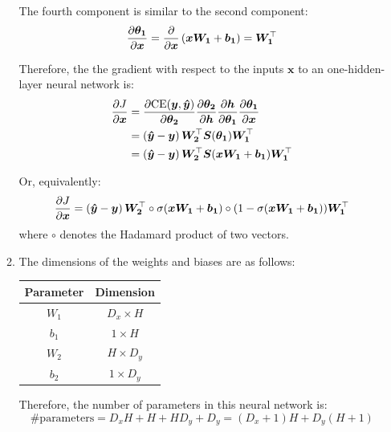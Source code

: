 \documentclass[10pt,reqno]{amsart}
\begin{document}
\begin{enumerate}[topsep=0pt,itemsep=3ex,partopsep=1ex,parsep=1ex]
\begin{enumerate}[itemsep=2ex]
    The fourth component is similar to the second component:
    \begin{equation*}
      \frac{\partial \bm{\theta_1}}{\partial \bm{x}} = \frac{\partial}{\partial \bm{x}} \left( \bm{x W_1} + \bm{b_1} \right) = \bm{W_1}^\top
    \end{equation*}

    Therefore, the the gradient with respect to the inputs $\bm{x}$ to an one-hidden-layer neural network is:
    \begin{align*}
      \frac{\partial J}{\partial \bm{x}}
      &= \frac{\partial \text{CE}(\bm{y}, \bm{\hat{y}})}{\partial \bm{\theta_2}} \frac{\partial \bm{\theta_2}}{\partial \bm{h}} \frac{\partial \bm{h}}{\partial \bm{\theta_1}} \frac{\partial \bm{\theta_1}}{\partial \bm{x}} \\
      &= \left( \bm{\hat{y}} - \bm{y} \right) \bm{W_2}^\top \bm{S}(\bm{\theta_1}) \bm{W_1}^\top \\
      &= \left( \bm{\hat{y}} - \bm{y} \right) \bm{W_2}^\top \bm{S}(\bm{x W_1} + \bm{b_1}) \bm{W_1}^\top
    \end{align*}

    Or, equivalently:
    \begin{equation*}
      \frac{\partial J}{\partial \bm{x}} 
      = \left( \bm{\hat{y}} - \bm{y} \right) \bm{W_2}^\top 
      \circ \sigma(\bm{x W_1} + \bm{b_1}) \circ ( 1 - \sigma(\bm{x W_1} + \bm{b_1}) ) \bm{W_1}^\top
    \end{equation*}
    where $\circ$ denotes the Hadamard product of two vectors. 
  \item
    The dimensions of the weights and biases are as follows:
    \vspace{1mm}
    \begin{center}
      \begin{tabular}{|c|c|}
        \hline
        Parameter & Dimension \\
        \hline
        $W_1$ & $D_x \times H$ \\
        $b_1$ & $1 \times H$ \\
        $W_2$ & $H \times D_y$ \\
        $b_2$ & $1 \times D_y$ \\
        \hline
      \end{tabular}
    \end{center}
    \vspace{1mm}
    Therefore, the number of parameters in this neural network is:
    \begin{equation*}
      \text{\# parameters} = D_x H + H + H D_y + D_y = (D_x + 1) H + D_y (H + 1)
    \end{equation*}


\end{enumerate}
\end{enumerate}
\end{document}
